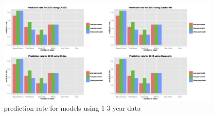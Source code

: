 \documentclass{article} %
\begin{document}
\begin{figure}[H]
\begin{center}
   \includegraphics[scale = 0.17]{year.jpg}
\end{center}
\caption{prediction rate for models using 1-3 year data}
\end{figure}
\end{document}
